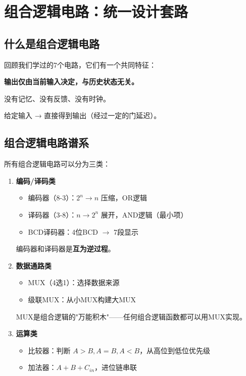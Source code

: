 \chapter{组合逻辑电路：统一设计套路}

\section{什么是组合逻辑电路}

回顾我们学过的7个电路，它们有一个共同特征：

\begin{keypoint}[组合逻辑电路的定义]
\textbf{输出仅由当前输入决定，与历史状态无关。}

没有记忆、没有反馈、没有时钟。

给定输入 → 直接得到输出（经过一定的门延迟）。
\end{keypoint}

\section{组合逻辑电路谱系}

所有组合逻辑电路可以分为三类：

\begin{enumerate}
  \item \textbf{编码/译码类}

  \begin{itemize}
    \item 编码器（8-3）：$2^n \to n$ 压缩，OR逻辑
    \item 译码器（3-8）：$n \to 2^n$ 展开，AND逻辑（最小项）
    \item BCD译码器：4位BCD $\to$ 7段显示
  \end{itemize}

  编码器和译码器是\textbf{互为逆过程}。

  \item \textbf{数据通路类}

  \begin{itemize}
    \item MUX（4选1）：选择数据来源
    \item 级联MUX：从小MUX构建大MUX
  \end{itemize}

  MUX是组合逻辑的"万能积木"——任何组合逻辑函数都可以用MUX实现。

  \item \textbf{运算类}

  \begin{itemize}
    \item 比较器：判断 $A>B, A=B, A<B$，从高位到低位优先级
    \item 加法器：$A+B+C_{in}$，进位链串联
  \end{itemize}
\end{enumerate}

